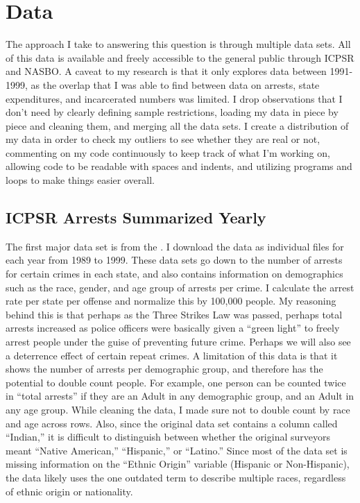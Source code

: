 \documentclass[12pt]{article}
\begin{document}
\section{Data}
    The approach I take to answering this question is through multiple data sets. All of this data is available and freely accessible to the general public through ICPSR and NASBO. A caveat to my research is that it only explores data between 1991-1999, as the overlap that I was able to find between data on arrests, state expenditures, and incarcerated numbers was limited. I drop observations that I don’t need by clearly defining sample restrictions, loading my data in piece by piece and cleaning them, and merging all the data sets. I create a distribution of my data in order to check my outliers to see whether they are real or not, commenting on my code continuously to keep track of what I’m working on, allowing code to be readable with spaces and indents, and utilizing programs and loops to make things easier overall.
    
\subsection{ICPSR Arrests Summarized Yearly}
    The first major data set is from the \cite{icpsr_ucr_arrests}. I download the data as individual files for each year from 1989 to 1999. These data sets go down to the number of arrests for certain crimes in each state, and also contains information on demographics such as the race, gender, and age group of arrests per crime. I calculate the arrest rate per state per offense and normalize this by 100,000 people. My reasoning behind this is that perhaps as the Three Strikes Law was passed, perhaps total arrests increased as police officers were basically given a “green light” to freely arrest people under the guise of preventing future crime. Perhaps we will also see a deterrence effect of certain repeat crimes. A limitation of this data is that it shows the number of arrests per demographic group, and therefore has the potential to double count people. For example, one person can be counted twice in “total arrests” if they are an Adult in any demographic group, and an Adult in any age group. While cleaning the data, I made sure not to double count by race and age across rows. Also, since the original data set contains a column called “Indian,” it is difficult to distinguish between whether the original surveyors meant “Native American,” “Hispanic,” or “Latino.” Since most of the data set is missing information on the “Ethnic Origin” variable (Hispanic or Non-Hispanic), the data likely uses the one outdated term to describe multiple races, regardless of ethnic origin or nationality.
\end{document}
